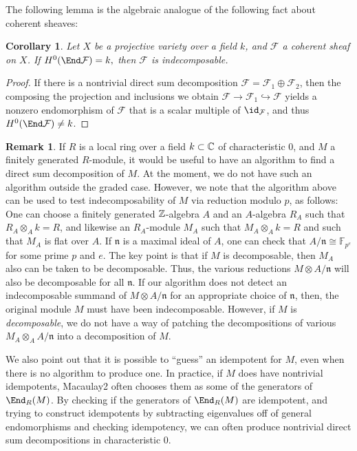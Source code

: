 \documentclass[12pt]{article}
\def\cF{\mathcal F}
\def\FF{\mathbb F}
\let\inc\hookrightarrow
\theoremstyle{theorem}
\numberwithin{thm}{section}
\newtheorem{cor}[thm]{Corollary}
\theoremstyle{definition}
\newtheorem{rem}[thm]{Remark}
\def\n{\mathfrak n}
\begin{document}
The following lemma is the algebraic analogue of the following fact about coherent sheaves:

\begin{cor}
  Let $X$ be a projective variety over a field $k$, and $\cF$ a coherent sheaf on $X$.
  If $ H^0(\End \cF) = k, $ then $\cF$ is indecomposable.
\end{cor}

\begin{proof}
  If there is a nontrivial direct sum decomposition $\cF = \cF_1\oplus \cF_2$, then the composing the projection and inclusions we obtain $\cF\to \cF_1\inc \cF$ yields a nonzero endomorphism of $\cF$ that is a scalar multiple of $\id_\cF$, and thus $H^0(\End \cF) \neq k$.
\end{proof}

\begin{rem}\label{rem:char}
  If $R$ is a local ring over a field $k\subset \mathbb C$ of characteristic 0, and $M$ a finitely generated $R$-module, it would be useful to have an algorithm to find a direct sum decomposition of $M$.
  At the moment, we do not have such an algorithm outside the graded case.
  However, we note that the algorithm above can be used to test indecomposability of $M$ via reduction modulo $p$, as follows:
  One can choose a finitely generated $\mathbb Z$-algebra $A$ and an $A$-algebra $R_A$ such that $R_A\otimes _A k=R$, and likewise an $R_A$-module $M_A$ such that $M_A\otimes _A k = R$ and such that $M_A$ is flat over $A$. If $\n$ is a maximal ideal of $A$, one can check that $A/\n \cong \FF_{p^e}$ for some prime $p$ and $e$.
  The key point is that if $M$ is decomposable, then $M_A$ also can be taken to be decomposable. Thus, the various reductions  $M\otimes A/\n$ will also be decomposable for all $\n$.
  If our algorithm does not detect an indecomposable summand of $M\otimes A/\n$ for an appropriate choice of $\n$, then, the original module $M$ must have been indecomposable.
  However, if $M$ is \emph{decomposable}, we do not have a way of patching the decompositions of various $M_A\otimes_A A/\n$ into a decomposition of $M$.

  We also point out that it is possible to ``guess'' an idempotent for $M$, even when there is no algorithm to produce one. In practice, if $M$ does have nontrivial idempotents, Macaulay2 often chooses them as some of the generators of $\End_R(M)$. By checking if the generators of $\End_R(M)$ are idempotent, and trying to construct idempotents by subtracting eigenvalues off of general endomorphisms and checking idempotency, we can often produce nontrivial direct sum decompositions in characteristic 0.
\end{rem}
\end{document}
